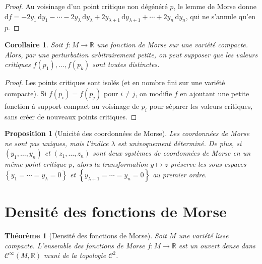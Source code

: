 \documentclass[12pt,a4paper,openany]{book}
\theoremstyle{definition}
\theoremstyle{plain}
\newtheorem{theoreme}[definition]{Théorème}
\newtheorem{proposition}[definition]{Proposition}
\newtheorem{corollaire}[definition]{Corollaire}
\theoremstyle{remark}
\newcommand{\R}{\mathbb{R}}
\newcommand{\dd}{\mathrm{d}}
\newcommand{\set}[1]{\left\{#1\right\}}
\begin{document}
\begin{proof}
Au voisinage d'un point critique non dégénéré $p$, le lemme de Morse donne
$\dd f = -2y_1 \, \dd y_1 - \cdots - 2y_\lambda \, \dd y_\lambda + 2y_{\lambda+1} \, \dd y_{\lambda+1} + \cdots + 2y_n \, \dd y_n$,
qui ne s'annule qu'en $p$.
\end{proof}

\begin{corollaire}\label{cor:morse-valeurs-distinctes}
Soit $f : M \to \R$ une fonction de Morse sur une variété compacte. Alors, par
une perturbation arbitrairement petite, on peut supposer que les valeurs critiques
$f(p_1), \ldots, f(p_k)$ sont toutes distinctes.
\end{corollaire}

\begin{proof}
Les points critiques sont isolés (et en nombre fini sur une variété compacte).
Si $f(p_i) = f(p_j)$ pour $i \neq j$, on modifie $f$ en ajoutant une petite
fonction à support compact au voisinage de $p_i$ pour séparer les valeurs
critiques, sans créer de nouveaux points critiques.
\end{proof}

\begin{proposition}[Unicité des coordonnées de Morse]\label{prop:morse-unicite}
Les coordonnées de Morse ne sont pas uniques, mais l'indice $\lambda$ est
univoquement déterminé. De plus, si $(y_1, \ldots, y_n)$ et $(z_1, \ldots, z_n)$
sont deux systèmes de coordonnées de Morse en un même point critique $p$, alors
la transformation $y \mapsto z$ préserve les sous-espaces
$\set{y_1 = \cdots = y_\lambda = 0}$ et $\set{y_{\lambda+1} = \cdots = y_n = 0}$
au premier ordre.
\end{proposition}

\section{Densité des fonctions de Morse}\label{sec:morse-densite}

\begin{theoreme}[Densité des fonctions de Morse]\label{thm:morse-dense}
Soit $M$ une variété lisse compacte. L'ensemble des fonctions de Morse
$f : M \to \R$ est un ouvert dense dans $\mathcal{C}^\infty(M, \R)$ muni de la
topologie $\mathcal{C}^2$.
\end{theoreme}
\end{document}
